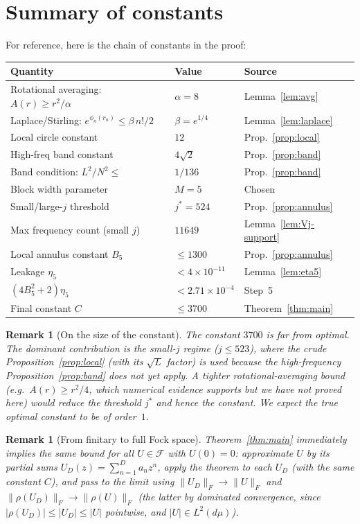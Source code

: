 \documentclass[11pt]{article}
\newtheorem{remark}[theorem]{Remark}
\newcommand{\rhof}{\rho}
\newcommand{\F}{\mathcal F}
\newcommand{\norm}[1]{\lVert #1\rVert}
\begin{document}
\section{Summary of constants}

For reference, here is the chain of constants in the proof:

\begin{center}
\renewcommand{\arraystretch}{1.3}
\begin{tabular}{lll}
\hline
\textbf{Quantity} & \textbf{Value} & \textbf{Source} \\
\hline
Rotational averaging: $A(r) \ge r^2/\alpha$ & $\alpha = 8$ & Lemma~\ref{lem:avg} \\
Laplace/Stirling: $e^{\phi_n(r_n)} \le \beta\, n!/2$ & $\beta = e^{1/4}$ & Lemma~\ref{lem:laplace} \\
Local circle constant & $12$ & Prop.~\ref{prop:local} \\
High-freq band constant & $4\sqrt{2}$ & Prop.~\ref{prop:band} \\
Band condition: $L^2/N^2 \le$ & $1/136$ & Prop.~\ref{prop:band} \\
Block width parameter & $M = 5$ & Chosen \\
Small/large-$j$ threshold & $j^* = 524$ & Prop.~\ref{prop:annulus} \\
Max frequency count (small $j$) & $11649$ & Lemma~\ref{lem:Vj-support} \\
Local annulus constant $B_5$ & $\le 1300$ & Prop.~\ref{prop:annulus} \\
Leakage $\eta_5$ & $< 4\times 10^{-11}$ & Lemma~\ref{lem:eta5} \\
$(4B_5^2+2)\eta_5$ & $< 2.71\times 10^{-4}$ & Step~5 \\
Final constant $C$ & $\le 3700$ & Theorem~\ref{thm:main} \\
\hline
\end{tabular}
\end{center}

\begin{remark}[On the size of the constant]
The constant $3700$ is far from optimal.
The dominant contribution is the small-$j$ regime ($j \le 523$), where
the crude Proposition~\ref{prop:local} (with its $\sqrt{L}$ factor) is used
because the high-frequency Proposition~\ref{prop:band} does not yet apply.
A tighter rotational-averaging bound (e.g.\ $A(r) \ge r^2/4$,
which numerical evidence supports but we have not proved here)
would reduce the threshold $j^*$ and hence the constant.
We expect the true optimal constant to be of order~$1$.
\end{remark}

\begin{remark}[From finitary to full Fock space]
Theorem~\ref{thm:main} immediately implies the same bound for all $U \in \F$ with $U(0) = 0$:
approximate $U$ by its partial sums $U_D(z) = \sum_{n=1}^D a_n z^n$,
apply the theorem to each $U_D$ (with the same constant $C$),
and pass to the limit using $\norm{U_D}_F \to \norm{U}_F$ and
$\norm{\rhof(U_D)}_F \to \norm{\rhof(U)}_F$ (the latter by dominated convergence,
since $|\rhof(U_D)| \le |U_D| \le |U|$ pointwise, and $|U| \in L^2(d\mu)$).
\end{remark}
\end{document}

